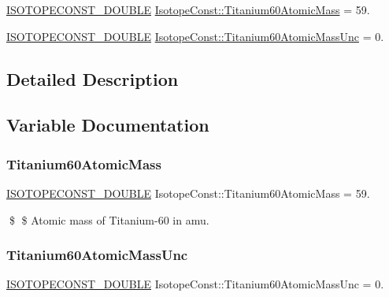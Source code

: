 \begin{DoxyCompactItemize}
\item 
\mbox{\hyperlink{group___isotope_const-_macros_ga8f45a7272ce02c0b4c65c44636ed719a}{I\+S\+O\+T\+O\+P\+E\+C\+O\+N\+S\+T\+\_\+\+D\+O\+U\+B\+LE}} \mbox{\hyperlink{group___isotope_const-_titanium-_ti60_gaa223841f18e9804a5083360e9b6f8fa2}{Isotope\+Const\+::\+Titanium60\+Atomic\+Mass}} = 59.
\item 
\mbox{\hyperlink{group___isotope_const-_macros_ga8f45a7272ce02c0b4c65c44636ed719a}{I\+S\+O\+T\+O\+P\+E\+C\+O\+N\+S\+T\+\_\+\+D\+O\+U\+B\+LE}} \mbox{\hyperlink{group___isotope_const-_titanium-_ti60_gab5de04d768e2c0c04ff87d44e5f6adc1}{Isotope\+Const\+::\+Titanium60\+Atomic\+Mass\+Unc}} = 0.
\end{DoxyCompactItemize}


\subsection{Detailed Description}


\subsection{Variable Documentation}
\mbox{\label{group___isotope_const-_titanium-_ti60_gaa223841f18e9804a5083360e9b6f8fa2}} 
\subsubsection{\texorpdfstring{Titanium60\+Atomic\+Mass}{Titanium60AtomicMass}}
{\footnotesize\ttfamily \mbox{\hyperlink{group___isotope_const-_macros_ga8f45a7272ce02c0b4c65c44636ed719a}{I\+S\+O\+T\+O\+P\+E\+C\+O\+N\+S\+T\+\_\+\+D\+O\+U\+B\+LE}} Isotope\+Const\+::\+Titanium60\+Atomic\+Mass = 59.}

\$ \$ Atomic mass of Titanium-\/60 in amu. \mbox{\label{group___isotope_const-_titanium-_ti60_gab5de04d768e2c0c04ff87d44e5f6adc1}} 
\subsubsection{\texorpdfstring{Titanium60\+Atomic\+Mass\+Unc}{Titanium60AtomicMassUnc}}
{\footnotesize\ttfamily \mbox{\hyperlink{group___isotope_const-_macros_ga8f45a7272ce02c0b4c65c44636ed719a}{I\+S\+O\+T\+O\+P\+E\+C\+O\+N\+S\+T\+\_\+\+D\+O\+U\+B\+LE}} Isotope\+Const\+::\+Titanium60\+Atomic\+Mass\+Unc = 0.}

